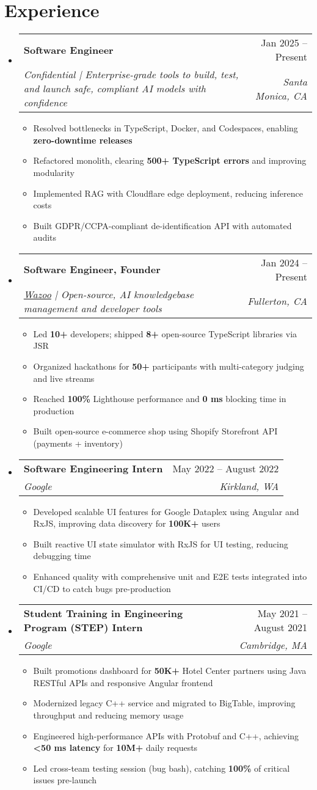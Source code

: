 \documentclass[letterpaper,11pt]{article}
\makeatletter
\newcommand{\resumeItem}[1]{
  \item\small{
    {#1 \vspace{-2pt}}
  }
}
\newcommand{\resumeSubheading}[4]{
  \vspace{-2pt}\item
    \begin{tabular*}{0.97\textwidth}[t]{l@{\extracolsep{\fill}}r}
      \textbf{#1} & #2 \\
      \textit{\small#3} & \textit{\small #4} \\
    \end{tabular*}\vspace{-2pt}
}
\newcommand{\resumeSubHeadingListStart}{\begin{itemize}[leftmargin=0.15in, label={}]}
\newcommand{\resumeSubHeadingListEnd}{\end{itemize}}
\newcommand{\resumeItemListStart}{\begin{itemize}}
\newcommand{\resumeItemListEnd}{\end{itemize}\vspace{-3pt}}
\makeatother
\begin{document}
\section{Experience}
\resumeSubHeadingListStart
  \resumeSubheading
    {Software Engineer}{Jan 2025 -- Present}
    {Confidential | Enterprise-grade tools to build, test, and launch safe, compliant AI models with confidence}{Santa Monica, CA}
    \resumeItemListStart
      \resumeItem{Resolved bottlenecks in TypeScript, Docker, and Codespaces, enabling \textbf{zero-downtime releases}}
      \resumeItem{Refactored monolith, clearing \textbf{500+ TypeScript errors} and improving modularity}
      \resumeItem{Implemented RAG with Cloudflare edge deployment, reducing inference costs}
      \resumeItem{Built GDPR/CCPA-compliant de-identification API with automated audits}
    \resumeItemListEnd
  
  \resumeSubheading
    {Software Engineer, Founder}{Jan 2024 -- Present}
    {\href{https://wazoo.tech/}{Wazoo} | Open-source, AI knowledgebase management and developer tools}{Fullerton, CA}
    \resumeItemListStart
      \resumeItem{Led \textbf{10+} developers; shipped \textbf{8+} open-source TypeScript libraries via JSR}
      \resumeItem{Organized hackathons for \textbf{50+} participants with multi-category judging and live streams}
      \resumeItem{Reached \textbf{100\%} Lighthouse performance and \textbf{0 ms} blocking time in production}
      \resumeItem{Built open-source e-commerce shop using Shopify Storefront API (payments + inventory)}
    \resumeItemListEnd

  \resumeSubheading
    {Software Engineering Intern}{May 2022 -- August 2022}
    {Google}{Kirkland, WA}
    \resumeItemListStart
      \resumeItem{Developed scalable UI features for Google Dataplex using Angular and RxJS, improving data discovery for \textbf{100K+} users}
      \resumeItem{Built reactive UI state simulator with RxJS for UI testing, reducing debugging time}
      \resumeItem{Enhanced quality with comprehensive unit and E2E tests integrated into CI/CD to catch bugs pre-production}
    \resumeItemListEnd

  \resumeSubheading
    {Student Training in Engineering Program (STEP) Intern}{May 2021 -- August 2021}
    {Google}{Cambridge, MA}
    \resumeItemListStart
      \resumeItem{Built promotions dashboard for \textbf{50K+} Hotel Center partners using Java RESTful APIs and responsive Angular frontend}
      \resumeItem{Modernized legacy C++ service and migrated to BigTable, improving throughput and reducing memory usage}
      \resumeItem{Engineered high-performance APIs with Protobuf and C++, achieving \textbf{<50 ms latency} for \textbf{10M+} daily requests}
      \resumeItem{Led cross-team testing session (bug bash), catching \textbf{100\%} of critical issues pre-launch}
    \resumeItemListEnd
\resumeSubHeadingListEnd
\end{document}
